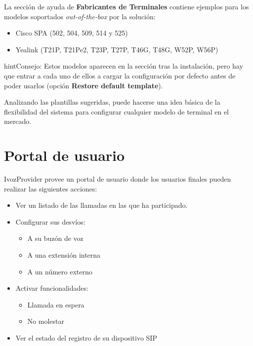 \documentclass[letterpaper,10pt,spanish]{sphinxmanual}
\begin{document}
La sección de ayuda de \textbf{Fabricantes de Terminales} contiene ejemplos para los modelos soportados \emph{out-of-the-box} por la solución:
\begin{itemize}
\item {} 
Cisco SPA (502, 504, 509, 514 y 525)

\item {} 
Yealink (T21P, T21Pe2, T23P, T27P, T46G, T48G, W52P, W56P)

\end{itemize}

\begin{notice}{hint}{Consejo:}
Estos modelos aparecen en la sección tras la instalación, pero hay que entrar a cada uno de ellos a cargar la configuración por defecto antes de poder usarlos (opción \textbf{Restore default template}).
\end{notice}

Analizando las plantillas sugeridas, puede hacerse una idea básica de la flexibilidad del sistema para configurar cualquier modelo de terminal en el mercado.


\chapter{Portal de usuario}
\label{userportal/index:userportal}\label{userportal/index:user-portal}\label{userportal/index::doc}
IvozProvider provee un portal de usuario donde los usuarios finales pueden realizar las siguientes acciones:
\begin{itemize}
\item {} 
Ver un listado de las llamadas en las que ha participado.

\item {} 
Configurar sus desvíos:
\begin{itemize}
\item {} 
A su buzón de voz

\item {} 
A una extensión interna

\item {} 
A un número externo

\end{itemize}

\item {} 
Activar funcionalidades:
\begin{itemize}
\item {} 
Llamada en espera

\item {} 
No molestar

\end{itemize}

\item {} 
Ver el estado del registro de su dispositivo SIP

\end{itemize}
\end{document}
